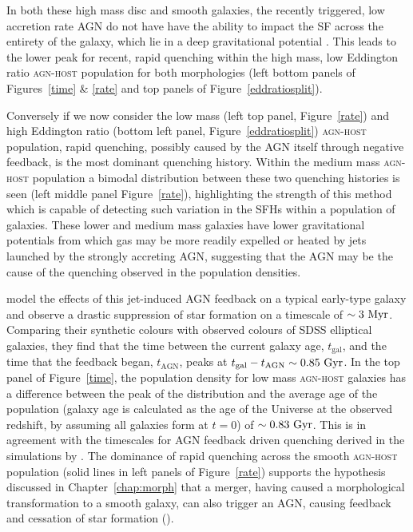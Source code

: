 In both these high mass disc and smooth galaxies, the recently triggered, low accretion rate AGN do not have have the ability to impact the SF across the entirety of the galaxy, which lie in a deep gravitational potential \citep{ishibashi12, Zinn13}. This leads to the lower peak for recent, rapid quenching within the high mass, low Eddington ratio \textsc{agn-host} population for both morphologies (left bottom panels of Figures~\ref{time} \& \ref{rate} and top panels of Figure~\ref{eddratiosplit}). 

Conversely if we now consider the low mass (left top panel, Figure~\ref{rate}) and high Eddington ratio (bottom left panel, Figure~\ref{eddratiosplit}) \textsc{agn-host} population, rapid quenching, possibly caused by the AGN itself through negative feedback, is the most dominant quenching history. Within the medium mass \textsc{agn-host} population a bimodal distribution between these two quenching histories is seen (left middle panel Figure~\ref{rate}), highlighting the strength of this method which is capable of detecting such variation in the SFHs within a population of galaxies. These lower and medium mass galaxies have lower gravitational potentials from which gas may be more readily expelled or heated \citep{tortora09} by jets launched by the strongly accreting AGN, suggesting that the AGN may be the cause of the quenching observed in the population densities.

\cite{tortora09} model the effects of this jet-induced AGN feedback on a typical early-type galaxy and observe a drastic suppression of star formation on a timescale of $\sim 3 ~\rm{Myr}$. Comparing their synthetic colours with observed colours of SDSS elliptical galaxies, they find that the time between the current galaxy age, $t_\mathrm{gal}$, and the time that the feedback began, $t_\mathrm{AGN}$, peaks at $t_\mathrm{gal} - t_\mathrm{AGN} \sim 0.85 ~\rm{Gyr}$. In the top panel of Figure~\ref{time}, the population density for low mass \textsc{agn-host} galaxies has a difference between the peak of the distribution and the average age of the population (galaxy age is calculated as the age of the Universe at the observed redshift, by assuming all galaxies form at $t=0$) of $\sim0.83 ~\rm{Gyr}$. This is in agreement with the timescales for AGN feedback driven quenching derived in the simulations by \citet{tortora09}. The dominance of rapid quenching across the smooth \textsc{agn-host} population (solid lines in left panels of Figure~\ref{rate}) supports the hypothesis discussed in Chapter~\ref{chap:morph} that a merger, having caused a morphological transformation to a smooth galaxy, can also trigger an AGN, causing feedback and cessation of star formation (\citealt{sanders88, pontzen16}).

